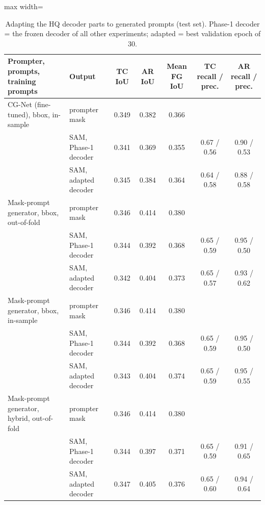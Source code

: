 \begin{table}[htbp]
\centering
\small
\begin{adjustbox}{max width=\linewidth}
\begin{tabular}{llccccc}
\toprule
Prompter, prompts, training prompts & Output & TC IoU & AR IoU & Mean FG IoU & TC recall / prec. & AR recall / prec. \\
\midrule
CG-Net (fine-tuned), bbox, in-sample & prompter mask & 0.349 & 0.382 & 0.366 &  &  \\
 & SAM, Phase-1 decoder & 0.341 & 0.369 & 0.355 & 0.67 / 0.56 & 0.90 / 0.53 \\
 & SAM, adapted decoder & 0.345 & 0.384 & 0.364 & 0.64 / 0.58 & 0.88 / 0.58 \\
\midrule
Mask-prompt generator, bbox, out-of-fold & prompter mask & 0.346 & 0.414 & 0.380 &  &  \\
 & SAM, Phase-1 decoder & 0.344 & 0.392 & 0.368 & 0.65 / 0.59 & 0.95 / 0.50 \\
 & SAM, adapted decoder & 0.342 & 0.404 & 0.373 & 0.65 / 0.57 & 0.93 / 0.62 \\
\midrule
Mask-prompt generator, bbox, in-sample & prompter mask & 0.346 & 0.414 & 0.380 &  &  \\
 & SAM, Phase-1 decoder & 0.344 & 0.392 & 0.368 & 0.65 / 0.59 & 0.95 / 0.50 \\
 & SAM, adapted decoder & 0.343 & 0.404 & 0.374 & 0.65 / 0.59 & 0.95 / 0.55 \\
\midrule
Mask-prompt generator, hybrid, out-of-fold & prompter mask & 0.346 & 0.414 & 0.380 &  &  \\
 & SAM, Phase-1 decoder & 0.344 & 0.397 & 0.371 & 0.65 / 0.59 & 0.91 / 0.65 \\
 & SAM, adapted decoder & 0.347 & 0.405 & 0.376 & 0.65 / 0.60 & 0.94 / 0.64 \\
\bottomrule
\end{tabular}
\end{adjustbox}
\caption{Adapting the HQ decoder parts to generated prompts (test set). Phase-1 decoder = the frozen decoder of all other experiments; adapted = best validation epoch of 30.}
\label{tab:decoder_adaptation_infused_mlp1}
\end{table}

